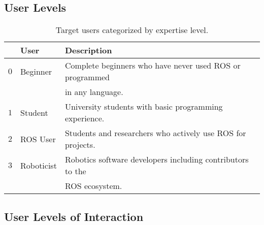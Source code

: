     \subsection{User Levels}

        \begin{table}[htbp]
            \color{textColor}
            \centering	
            \caption{Target users categorized by expertise level.}
                \begin{tabular}{rll}
                    \toprule
                    & \textbf{User}   & \textbf{Description} \\
                    \midrule
                    $0$ & Beginner    & Complete beginners who have never used ROS or programmed \\
                    & & in any language. \\[0.5em]

                    $1$ & Student     & University students with basic programming experience. \\[0.5em]

                    $2$ & ROS User    & Students and researchers who actively use ROS for projects. \\[0.5em]

                    $3$ &  Roboticist & Robotics software developers including contributors to the \\
                    & & ROS ecosystem. \\
                \bottomrule
            \end{tabular}\label{tab:userlevels}
        \end{table}

    \subsection{User Levels of Interaction}

